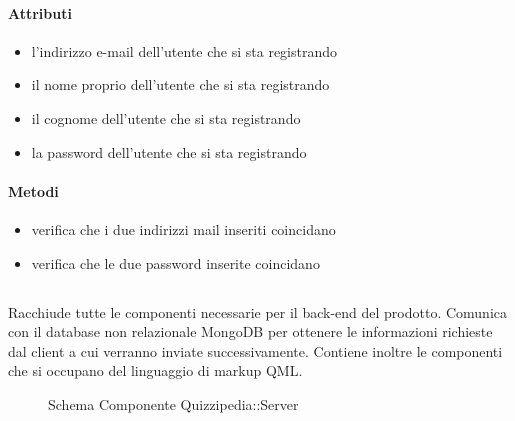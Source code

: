 \paragraph{Attributi}
\begin{itemize}
\item {}
\newline
l'indirizzo e-mail dell'utente che si sta registrando
\item {}
\newline
il nome proprio dell'utente che si sta registrando
\item {}
\newline
il cognome dell'utente che si sta registrando
\item {}
\newline
la password dell'utente che si sta registrando
\end{itemize}
\paragraph{Metodi}
\begin{itemize}
\item {}
\newline
verifica che i due indirizzi mail inseriti coincidano
\newline
\item {}
\newline
verifica che le due password inserite coincidano
\newline
\end{itemize}
\subsection{}
Racchiude tutte le componenti necessarie per il back-end del prodotto. Comunica con il database non relazionale MongoDB per ottenere le informazioni richieste dal client a cui verranno inviate successivamente.
Contiene inoltre le componenti che si occupano del linguaggio di markup QML.
\begin{figure}[H]
\centering
\noindent{}
\caption[Schema Componente Server]{Schema Componente Quizzipedia::Server}
\end{figure}
